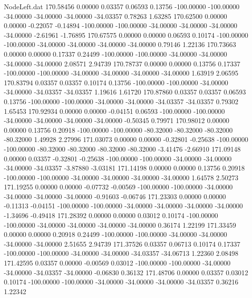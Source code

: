 \begin{filecontents}{NodeLeft.dat}
 170.58456    0.00000    0.03357     0.06593    0.13756 -100.00000 -100.00000  -34.00000  -34.00000  -34.00000  -34.03357    0.78263    1.63285
 170.62500    0.00000    0.00000    -0.22057   -0.14894 -100.00000 -100.00000  -34.00000  -34.00000  -34.00000  -34.00000   -2.61961   -1.76895
 170.67575    0.00000    0.00000     0.06593    0.10174 -100.00000 -100.00000  -34.00000  -34.00000  -34.00000  -34.00000    0.79146    1.22136
 170.73663    0.00000    0.00000     0.17337    0.24499 -100.00000 -100.00000  -34.00000  -34.00000  -34.00000  -34.00000    2.08571    2.94739
 170.78737    0.00000    0.00000     0.13756    0.17337 -100.00000 -100.00000  -34.00000  -34.00000  -34.00000  -34.00000    1.63919    2.06595
 170.83794    0.03357    0.03357     0.10174    0.13756 -100.00000 -100.00000  -34.00000  -34.00000  -34.03357  -34.03357    1.19616    1.61720
 170.87860    0.03357    0.03357     0.06593    0.13756 -100.00000 -100.00000  -34.00000  -34.00000  -34.03357  -34.03357    0.79302    1.65453
 170.92934    0.00000    0.00000    -0.04151    0.06593 -100.00000 -100.00000  -34.00000  -34.00000  -34.00000  -34.00000   -0.50345    0.79971
 170.98012    0.00000    0.00000     0.13756    0.20918 -100.00000 -100.00000  -80.32000  -80.32000  -80.32000  -80.32000    1.49928    2.27996
 171.03073    0.00000    0.00000    -0.32801   -0.25638 -100.00000 -100.00000  -80.32000  -80.32000  -80.32000  -80.32000   -3.41476   -2.66910
 171.09148    0.00000    0.03357    -0.32801   -0.25638 -100.00000 -100.00000  -34.00000  -34.00000  -34.00000  -34.03357   -3.87880   -3.03181
 171.14198    0.00000    0.00000     0.13756    0.20918 -100.00000 -100.00000  -34.00000  -34.00000  -34.00000  -34.00000    1.64578    2.50273
 171.19255    0.00000    0.00000    -0.07732   -0.00569 -100.00000 -100.00000  -34.00000  -34.00000  -34.00000  -34.00000   -0.91603   -0.06746
 171.23303    0.00000    0.00000    -0.11313   -0.04151 -100.00000 -100.00000  -34.00000  -34.00000  -34.00000  -34.00000   -1.34696   -0.49418
 171.28392    0.00000    0.00000     0.03012    0.10174 -100.00000 -100.00000  -34.00000  -34.00000  -34.00000  -34.00000    0.36174    1.22199
 171.33459    0.00000    0.00000     0.20918    0.24499 -100.00000 -100.00000  -34.00000  -34.00000  -34.00000  -34.00000    2.51655    2.94739
 171.37526    0.03357    0.06713     0.10174    0.17337 -100.00000 -100.00000  -34.00000  -34.00000  -34.03357  -34.06713    1.22360    2.08498
 171.42595    0.03357    0.00000    -0.00569    0.03012 -100.00000 -100.00000  -34.00000  -34.00000  -34.03357  -34.00000   -0.06830    0.36132
 171.48706    0.00000    0.03357     0.03012    0.10174 -100.00000 -100.00000  -34.00000  -34.00000  -34.00000  -34.03357    0.36216    1.22342

\end{filecontents}
